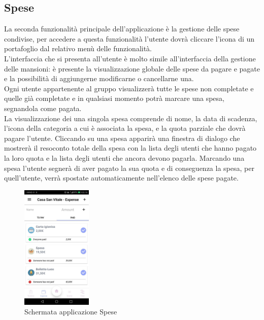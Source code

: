 \subsection{Spese}
La seconda funzionalità principale dell'applicazione è la gestione delle spese condivise, per accedere a questa funzionalità l'utente dovrà cliccare l'icona di un portafoglio dal relativo menù delle funzionalità.\\
L'interfaccia che si presenta all'utente è molto simile all'interfaccia della gestione delle mansioni: è presente la visualizzazione globale delle spese da pagare e pagate e la possibilità di aggiungerne modificarne o cancellarne una.\\
Ogni utente appartenente al gruppo visualizzerà tutte le spese non completate e quelle già completate e in qualsiasi momento potrà marcare una spesa, segnandola come pagata.\\
La visualizzazione dei una singola spesa comprende di nome, la data di scadenza, l'icona della categoria a cui è associata la spesa, e la quota parziale che dovrà pagare l'utente. Cliccando su una spesa apparirà una finestra di dialogo che mostrerà il resoconto totale della spesa con la lista degli utenti che hanno pagato la loro quota e la lista degli utenti che ancora devono pagarla. Marcando una spesa l'utente segnerà di aver pagato la sua quota e di conseguenza la spesa, per quell'utente, verrà spostate automaticamente nell'elenco delle spese pagate.\\

\begin{figure}[!h]
  \centering
  \includegraphics[width=0.3\textwidth]{immagini/app_expense.jpg}
  \caption{Schermata applicazione Spese}\label{fig:Schermata applicazione Spese}
\end{figure}

